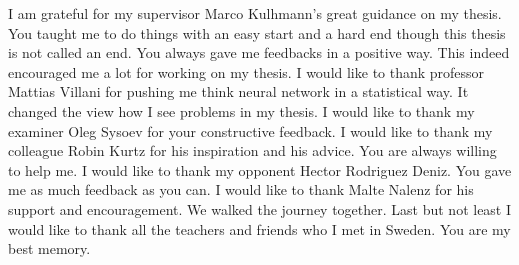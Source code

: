 I am grateful for my supervisor Marco Kulhmann's great guidance on my thesis. You taught me to do things with an easy start and a hard end though this thesis is not called an end. You 
always gave me feedbacks in a positive way. This indeed encouraged me a lot for working on my thesis. I would like to thank professor Mattias Villani for pushing me think neural network in a statistical way. It changed the view how I see problems in my thesis. I would like to thank my examiner Oleg Sysoev for your constructive feedback. I would like to thank my colleague Robin Kurtz for his inspiration and his advice. You are always willing to help me. I would like to thank my opponent Hector Rodriguez Deniz. You gave me as much feedback as you can. I would like to thank Malte Nalenz for his support and encouragement. We walked the journey together. Last but not least I would like to thank all the teachers and friends who I met in Sweden. You are my best memory.

